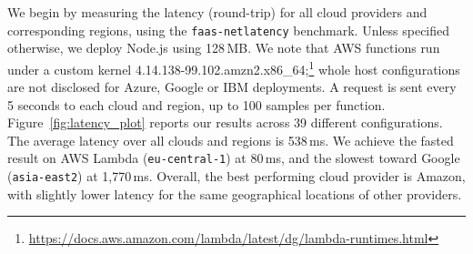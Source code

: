 We begin by measuring the latency (round-trip) for all cloud providers and corresponding regions, using the \texttt{faas-netlatency} benchmark.
Unless specified otherwise, we deploy Node.js using 128\,\gls{MB}.
We note that AWS functions run under a custom kernel 4.14.138-99.102.amzn2.x86\_64;\footnote{\url{https://docs.aws.amazon.com/lambda/latest/dg/lambda-runtimes.html}} 
whole host configurations are not disclosed for Azure, Google or IBM deployments.
A request is sent every 5 seconds to each cloud and region, up to 100 samples per function.
Figure~\ref{fig:latency_plot} reports our results across 39 different configurations. 
The average latency over all clouds and regions is 538\,ms.
We achieve the fasted result on AWS Lambda (\texttt{eu-central-1}) at 80\,ms, and the slowest toward Google (\texttt{asia-east2}) at 1,770\,ms. 
Overall, the best performing cloud provider is Amazon, with slightly lower latency for the same geographical locations of other providers.

